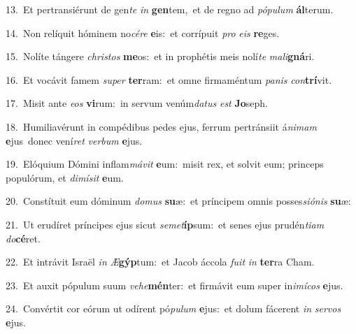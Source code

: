 {\numbfont\textcolor{\numbcolor}{13.}}~Et pertransiérunt de gen\textit{te} \textit{in} \textbf{gen}\-tem,~\star et de regno ad \textit{pó}\-\textit{pu}\textit{lum} \textbf{ál}\-terum.\par
{\numbfont\textcolor{\numbcolor}{14.}}~Non relíquit hóminem no\-\textit{cé}\-\textit{re} \textbf{e}\-is:~\star et corrípuit \textit{pro} \textit{e}\-\textit{is} \textbf{re}\-ges.\par
{\numbfont\textcolor{\numbcolor}{15.}}~Nolíte tángere \textit{chris}\-\textit{tos} \textbf{me}\-os:~\star et in prophétis meis nolí\textit{te} \textit{ma}\-\textit{li}\textbf{gná}ri.\par
{\numbfont\textcolor{\numbcolor}{16.}}~Et vocávit famem \textit{su}\-\textit{per} \textbf{ter}\-ram:~\star et omne firmaméntum \textit{pa}\-\textit{nis} \textit{con}\-\textbf{trí}vit.\par
{\numbfont\textcolor{\numbcolor}{17.}}~Misit ante \textit{e}\-\textit{os} \textbf{vi}\-rum:~\star in servum venúm\-\textit{da}\-\textit{tus} \textit{est} \textbf{Jo}\-seph.\par
{\numbfont\textcolor{\numbcolor}{18.}}~Humiliavérunt in compédibus pedes ejus, ferrum pertránsiit á\-\textit{ni}\-\textit{mam} \textbf{e}\-jus~\star donec vení\textit{ret} \textit{ver}\-\textit{bum} \textbf{e}\-jus.\par
{\numbfont\textcolor{\numbcolor}{19.}}~Elóquium Dómini inflam\-\textit{má}\-\textit{vit} \textbf{e}\-um:~\star misit rex, et solvit eum; princeps populórum, et \textit{di}\-\textit{mí}\textit{sit} \textbf{e}\-um.\par
{\numbfont\textcolor{\numbcolor}{20.}}~Constítuit eum dóminum \textit{do}\-\textit{mus} \textbf{su}\-æ:~\star et príncipem omnis posses\-\textit{si}\-\textit{ó}\textit{nis} \textbf{su}\-æ:\par
{\numbfont\textcolor{\numbcolor}{21.}}~Ut erudíret príncipes ejus sicut \textit{se}\-\textit{met}\textbf{íp}sum:~\star et senes ejus prudén\-\textit{ti}\-\textit{am} \textit{do}\-\textbf{cé}ret.\par
{\numbfont\textcolor{\numbcolor}{22.}}~Et intrávit Israël \textit{in} \textit{Æ}\-\textbf{gýp}tum:~\star et Jacob áccola \textit{fu}\-\textit{it} \textit{in} \textbf{ter}\-ra Cham.\par
{\numbfont\textcolor{\numbcolor}{23.}}~Et auxit pópulum suum \textit{ve}\-\textit{he}\textbf{mén}ter:~\star et firmávit eum super in\-\textit{i}\-\textit{mí}\textit{cos} \textbf{e}\-jus.\par
{\numbfont\textcolor{\numbcolor}{24.}}~Convértit cor eórum ut odírent pó\-\textit{pu}\-\textit{lum} \textbf{e}\-jus:~\star et dolum fácerent \textit{in} \textit{ser}\-\textit{vos} \textbf{e}\-jus.\par
